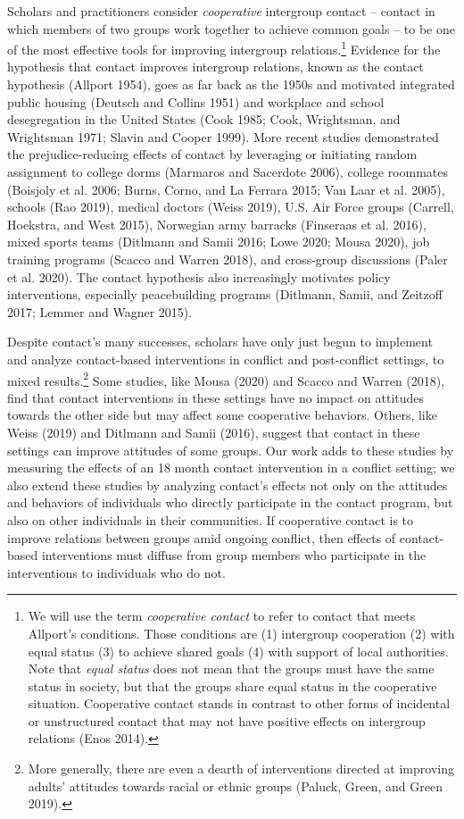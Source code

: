 \documentclass[11pt]{article}
\begin{document}
Scholars and practitioners consider \emph{cooperative} intergroup
contact -- contact in which members of two groups work together to
achieve common goals -- to be one of the most effective tools for
improving intergroup relations.\footnote{We will use the term
  \emph{cooperative contact} to refer to contact that meets Allport's
  conditions. Those conditions are (1) intergroup cooperation (2) with
  equal status (3) to achieve shared goals (4) with support of local
  authorities. Note that \emph{equal status} does not mean that the
  groups must have the same status in society, but that the groups share
  equal status in the cooperative situation. Cooperative contact stands
  in contrast to other forms of incidental or unstructured contact that
  may not have positive effects on intergroup relations (Enos 2014).}
Evidence for the hypothesis that contact improves intergroup relations,
known as the contact hypothesis (Allport 1954), goes as far back as the
1950s and motivated integrated public housing (Deutsch and Collins 1951)
and workplace and school desegregation in the United States (Cook 1985;
Cook, Wrightsman, and Wrightsman 1971; Slavin and Cooper 1999). More
recent studies demonstrated the prejudice-reducing effects of contact by
leveraging or initiating random assignment to college dorms (Marmaros
and Sacerdote 2006), college roommates (Boisjoly et al. 2006; Burns,
Corno, and La Ferrara 2015; Van Laar et al. 2005), schools (Rao 2019),
medical doctors (Weiss 2019), U.S. Air Force groups (Carrell, Hoekstra,
and West 2015), Norwegian army barracks (Finseraas et al. 2016), mixed
sports teams (Ditlmann and Samii 2016; Lowe 2020; Mousa 2020), job
training programs (Scacco and Warren 2018), and cross-group discussions
(Paler et al. 2020). The contact hypothesis also increasingly motivates
policy interventions, especially peacebuilding programs (Ditlmann,
Samii, and Zeitzoff 2017; Lemmer and Wagner 2015).

Despite contact's many successes, scholars have only just begun to
implement and analyze contact-based interventions in conflict and
post-conflict settings, to mixed results.\footnote{More generally, there
  are even a dearth of interventions directed at improving adults'
  attitudes towards racial or ethnic groups (Paluck, Green, and Green
  2019).} Some studies, like Mousa (2020) and Scacco and Warren (2018),
find that contact interventions in these settings have no impact on
attitudes towards the other side but may affect some cooperative
behaviors. Others, like Weiss (2019) and Ditlmann and Samii (2016),
suggest that contact in these settings can improve attitudes of some
groups. Our work adds to these studies by measuring the effects of an 18
month contact intervention in a conflict setting; we also extend these
studies by analyzing contact's effects not only on the attitudes and
behaviors of individuals who directly participate in the contact
program, but also on other individuals in their communities. If
cooperative contact is to improve relations between groups amid ongoing
conflict, then effects of contact-based interventions must diffuse from
group members who participate in the interventions to individuals who do
not.
\end{document}
